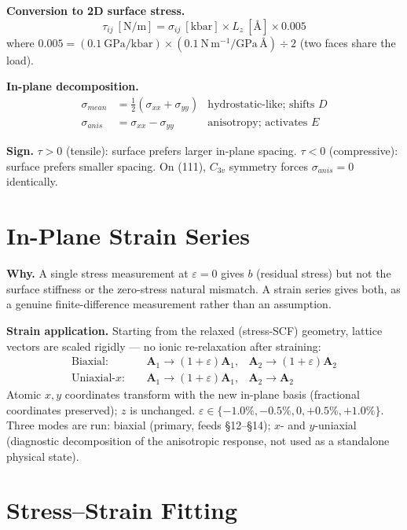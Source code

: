 \documentclass[11pt]{article}
\begin{document}
\textbf{Conversion to 2D surface stress.}
\begin{equation}
\tau_{ij}\ [\text{N/m}] = \sigma_{ij}\ [\text{kbar}] \times L_z\ [\text{\AA}] \times 0.005
\end{equation}
where $0.005 = (0.1\ \text{GPa/kbar}) \times (0.1\ \text{N}\,\text{m}^{-1}/\text{GPa}\,\text{\AA}) \div 2$ (two faces share the load).

\textbf{In-plane decomposition.}
\begin{align}
\sigma_{mean} &= \tfrac{1}{2}(\sigma_{xx} + \sigma_{yy}) & \text{hydrostatic-like; shifts } D \\
\sigma_{anis} &= \sigma_{xx} - \sigma_{yy} & \text{anisotropy; activates } E
\end{align}

\textbf{Sign.} $\tau > 0$ (tensile): surface prefers larger in-plane spacing. $\tau < 0$ (compressive): surface prefers smaller spacing. On (111), $C_{3v}$ symmetry forces $\sigma_{anis} = 0$ identically.

\section{In-Plane Strain Series}

\textbf{Why.} A single stress measurement at $\varepsilon = 0$ gives $b$ (residual stress) but not the surface stiffness or the zero-stress natural mismatch. A strain series gives both, as a genuine finite-difference measurement rather than an assumption.

\textbf{Strain application.} Starting from the relaxed (stress-SCF) geometry, lattice vectors are scaled rigidly --- no ionic re-relaxation after straining:
\begin{align}
\text{Biaxial:}\quad & \mathbf{A}_1 \to (1+\varepsilon)\mathbf{A}_1, & \mathbf{A}_2 \to (1+\varepsilon)\mathbf{A}_2 \\
\text{Uniaxial-}x:\quad & \mathbf{A}_1 \to (1+\varepsilon)\mathbf{A}_1, & \mathbf{A}_2 \to \mathbf{A}_2
\end{align}
Atomic $x,y$ coordinates transform with the new in-plane basis (fractional coordinates preserved); $z$ is unchanged. $\varepsilon \in \{-1.0\%, -0.5\%, 0, +0.5\%, +1.0\%\}$. Three modes are run: biaxial (primary, feeds \S12--\S14); $x$- and $y$-uniaxial (diagnostic decomposition of the anisotropic response, not used as a standalone physical state).

\section{Stress--Strain Fitting}
\end{document}

